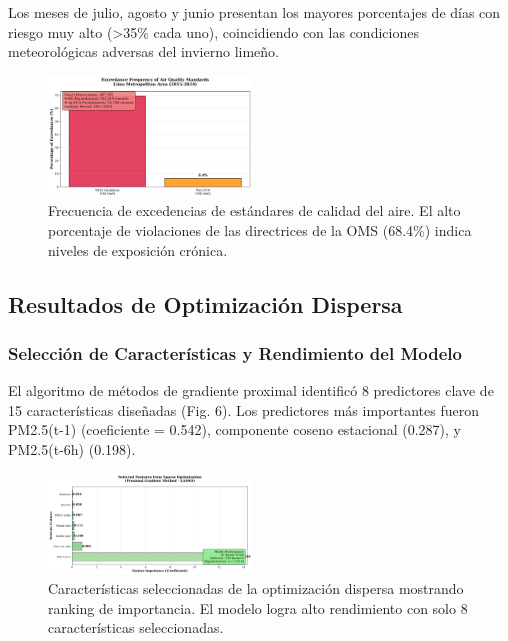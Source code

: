 \documentclass[conference]{IEEEtran}
\begin{document}
Los meses de julio, agosto y junio presentan los mayores porcentajes de días con riesgo muy alto (>35\% cada uno), coincidiendo con las condiciones meteorológicas adversas del invierno limeño.

\begin{figure}[htbp]
\centerline{\includegraphics[width=0.48\textwidth]{Figura_5_Superaciones_PM25.png}}
\caption{Frecuencia de excedencias de estándares de calidad del aire. El alto porcentaje de violaciones de las directrices de la OMS (68.4\%) indica niveles de exposición crónica.}
\label{fig:exceedances}
\end{figure}

\subsection{Resultados de Optimización Dispersa}

\subsubsection{Selección de Características y Rendimiento del Modelo}

El algoritmo de métodos de gradiente proximal identificó 8 predictores clave de 15 características diseñadas (Fig. 6). Los predictores más importantes fueron PM2.5(t-1) (coeficiente = 0.542), componente coseno estacional (0.287), y PM2.5(t-6h) (0.198).

\begin{figure}[htbp]
\centerline{\includegraphics[width=0.48\textwidth]{Figura_6_Caracteristicas_Dispersas_PM25.png}}
\caption{Características seleccionadas de la optimización dispersa mostrando ranking de importancia. El modelo logra alto rendimiento con solo 8 características seleccionadas.}
\label{fig:features}
\end{figure}
\end{document}
